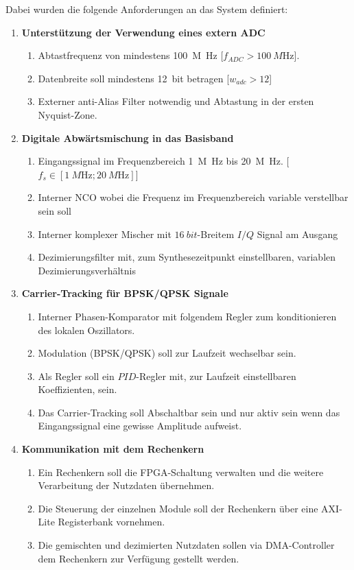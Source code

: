 Dabei wurden die folgende Anforderungen an das System definiert:
\begin{enumerate}
	\item \textbf{Unterstützung der Verwendung eines extern \acs{ADC}}
	\begin{enumerate}[label*=\arabic*.]
		\item Abtastfrequenz von mindestens \qty{100}{M\hertz} [$f_{ADC} > \qty{100}{M\hertz}$].
		\item Datenbreite soll mindestens \qty{12}{bit} betragen [$w_{adc} > 12$]
		\item Externer anti-Alias Filter notwendig und Abtastung in der ersten Nyquist-Zone.
	\end{enumerate}

	\item \textbf{Digitale Abwärtsmischung in das Basisband}
	\begin{enumerate}[label*=\arabic*.]
		\item Eingangssignal im Frequenzbereich \qty{1}{M\hertz} bis \qty{20}{M\hertz}. [$f_s \in [\qty{1}{M\hertz};\qty{20}{M\hertz}]$]
		\item Interner \acl{NCO} wobei die Frequenz im Frequenzbereich variable verstellbar sein soll
		\item Interner komplexer Mischer mit $\qty{16}{bit}$-Breitem $I/Q$ Signal am Ausgang
		\item Dezimierungsfilter mit, zum Synthesezeitpunkt einstellbaren, variablen Dezimierungsverhältnis
	\end{enumerate}

	\item \textbf{Carrier-Tracking für \acs{BPSK}/\acs{QPSK} Signale}
	\begin{enumerate}[label*=\arabic*.]
		\item Interner Phasen-Komparator mit folgendem Regler zum konditionieren des lokalen Oszillators.
		\item Modulation (\acs{BPSK}/\acs{QPSK}) soll zur Laufzeit wechselbar sein.
		\item Als Regler soll ein $PID$-Regler mit, zur Laufzeit einstellbaren Koeffizienten, sein.
		\item Das Carrier-Tracking soll Abschaltbar sein und nur aktiv sein wenn das Eingangssignal eine gewisse Amplitude aufweist.
	\end{enumerate}

	\item \textbf{Kommunikation mit dem Rechenkern}
	\begin{enumerate}[label*=\arabic*.]
		\item Ein Rechenkern soll die \acs{FPGA}-Schaltung verwalten und die weitere Verarbeitung der Nutzdaten übernehmen.
		\item Die Steuerung der einzelnen Module soll der Rechenkern über eine \acs{AXI}-Lite Registerbank vornehmen.
		\item Die gemischten und dezimierten Nutzdaten sollen via \acl{DMA}-Controller dem Rechenkern zur Verfügung gestellt werden.
	\end{enumerate}
\end{enumerate}


